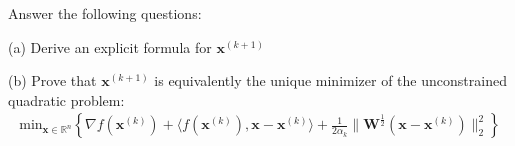 \documentclass{article}
\newcommand{\R}{\mathbb{R}}
\begin{document}
Answer the following questions:

(a) Derive an explicit formula for \(\bm{x}^{(k + 1)}\)

(b) Prove that \(\bm{x}^{(k + 1)}\) is equivalently the unique minimizer of the unconstrained quadratic problem:
\begin{align*}
    \text{min}_{\bm{x} \in \R^n} \left \{ \nabla f(\bm{x}^{(k)}) + \langle f(\bm{x}^{(k)}), \bm{x} - \bm{x}^{(k)} \rangle + \frac{1}{2\alpha_k} \|\bm{W}^{\frac{1}{2}} (\bm{x} - \bm{x}^{(k)})\|_2^2 \right \}
\end{align*}
\end{document}
